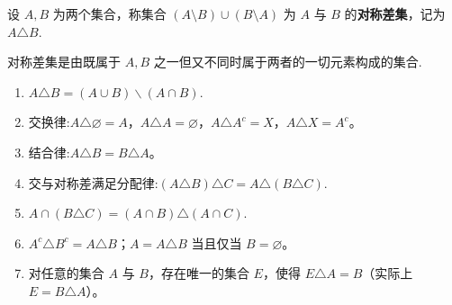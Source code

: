 \documentclass[../../main.tex]{subfiles}%
\begin{document}
\begin{definition}[对称差集]
设 \( A,B \) 为两个集合，称集合 \( (A \setminus B) \cup (B \setminus A) \) 为 \( A \) 与 \( B \) 的\textbf{对称差集}，记为 \( A \triangle B \).
\end{definition}
\begin{note}
对称差集是由既属于 \( A,B \) 之一但又不同时属于两者的一切元素构成的集合.
\end{note}

\begin{theorem}[集合对称差的性质]\label{theorem:集合对称差的性质}
\begin{enumerate}[(1)]
\item \(A \triangle B = \left( A\cup B \right) \backslash \left( A\cap B \right) .\)

\item 交换律:\( A \triangle \varnothing = A \)，\( A \triangle A = \varnothing \)，\( A \triangle A^c = X \)，\( A \triangle X = A^c \)。

\item 结合律:\( A \triangle B = B \triangle A \)。

\item 交与对称差满足分配律:\(
(A \triangle B) \triangle C = A \triangle (B \triangle C).
\)

\item $A \cap (B \triangle C) = (A \cap B) \triangle (A \cap C).$

\item \( A^c \triangle B^c = A \triangle B \)；\( A = A \triangle B \) 当且仅当 \( B = \varnothing \)。

\item 对任意的集合 \( A \) 与 \( B \)，存在唯一的集合 \( E \)，使得 \( E \triangle A = B \)（实际上 \( E = B \triangle A \)）。
\end{enumerate}
\end{theorem}
\end{document}
